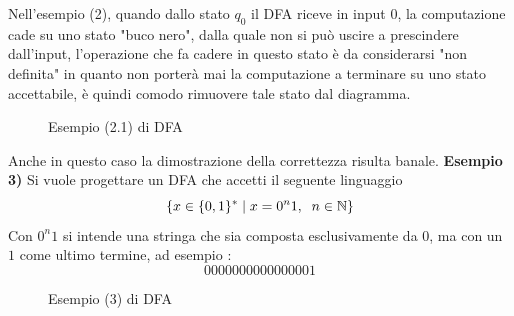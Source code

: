 \documentclass[10pt, letterpaper]{report}
\begin{document}
Nell'esempio (2), quando dallo stato $q_0$ il DFA riceve in input $0$, la computazione cade su uno stato 
"buco nero", dalla quale non si può uscire a prescindere dall'input, l'operazione che fa 
cadere in questo stato è da considerarsi "non definita" in quanto non porterà mai la computazione 
a terminare su uno stato accettabile, è quindi comodo rimuovere tale stato dal diagramma.
\begin{figure}[h!]
    \centering
        \caption{Esempio (2.1) di DFA}
        \label{fig:DFAExample2.1}
\end{figure}\acc 
Anche in questo caso la dimostrazione della correttezza risulta banale.\acc 
\textbf{Esempio 3)} Si vuole progettare un DFA che accetti il seguente linguaggio 
$$ \{x\in\{0,1\}^* \;|\;x=0^n1,\;\;n\in {\mathbb N}\}$$
Con $0^n1$ si intende una stringa che sia composta esclusivamente da $0$, ma con un $1$ come 
ultimo termine, ad esempio : $$0000000000000001$$\newpage
\begin{figure}[h!]
    \centering
        \caption{Esempio (3) di DFA}
        \label{fig:DFAExampl3}
\end{figure}
\flowerLine 
\end{document}
